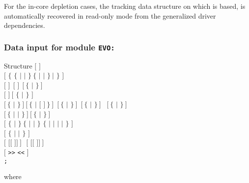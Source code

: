 For the in-core depletion cases, the tracking  data structure on which
 is based, is automatically recovered in read-only mode from the
generalized driver dependencies.

\subsubsection{Data input for module {\tt EVO:}}\label{sect:descevo}

\begin{DataStructure}{Structure }
$[$   $]$ \\
$[$ $\{$   $\{$  $|$  $|$  $\}~\{$
  $|$   $|$   $\}~|$
 $\}$ $]$ \\
$[$   $]~~[$   $]~~[~\{$   $|$  $\}~]$ \\
$[$   $]~[$ $\{$  $|$  $\}$ $]$ \\
$[~\{$  $|$  $\}~]~[~\{$ $|$  $[$  $]~\}~]$~$[~\{$ $|$ $\}~]$~$[~\{$ $|$ $\}~]$~
$[~\{$ $|$ $\}~]$ \\
$[~\{$ $|$  $|$  $\}~]~[~\{$  $|$  $\}~]$ \\
$[$  $\{$  $|$  $\}~\{$  $|$  $|$  $\}$ $\{$  $|$
  $|$   $|$   $|$  $\}$ $]$ \\
$[$   $\{$  $|$  $|$  $\}$ $]$ \\
$[$  $[[$  $]] ~]~~~[$  $[[$  $]] ~]$ \\
$[$   {\tt >>}  {\tt <<} $]$ \\
{\tt ;}
\end{DataStructure}

\noindent
where

